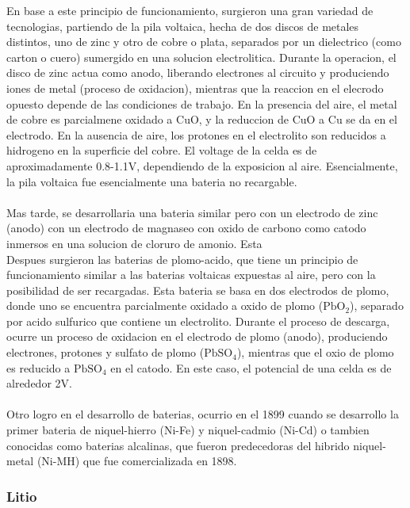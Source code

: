 \documentclass[10pt,a4paper]{article}
\begin{document}
    \clearpage

    \noindent En base a este principio de funcionamiento, surgieron una gran 
    variedad de tecnologias, partiendo de la pila voltaica, hecha de dos discos
    de metales distintos, uno de zinc y otro de cobre o plata, separados por un
    dielectrico (como carton o cuero) sumergido en una solucion electrolitica.
    Durante la operacion, el disco de zinc actua como anodo, liberando
    electrones al circuito y produciendo iones de metal (proceso de oxidacion),
    mientras que la reaccion en el elecrodo opuesto depende de las condiciones
    de trabajo. En la presencia del aire, el metal de cobre es parcialmene
    oxidado a CuO, y la reduccion de CuO a Cu se da en el electrodo. En la
    ausencia de aire, los protones en el electrolito son reducidos a hidrogeno
    en la superficie del cobre. El voltage de la celda es de aproximadamente
    0.8-1.1V, dependiendo de la exposicion al aire. Esencialmente, la pila
    voltaica fue esencialmente una bateria no recargable. \\
    \\
    \noindent Mas tarde, se desarrollaria una bateria similar pero con un 
    electrodo de zinc (anodo) con un electrodo de magnaseo con oxido de carbono 
    como catodo inmersos en una solucion de cloruro de amonio. Esta 
    \\
    \noindent Despues surgieron las baterias de plomo-acido, que tiene un 
    principio de funcionamiento similar a las baterias voltaicas expuestas al 
    aire, pero con la posibilidad de ser recargadas. Esta bateria se basa en 
    dos electrodos de plomo, donde uno se encuentra parcialmente oxidado a 
    oxido de plomo ($\mathrm{PbO_2}$), separado por acido sulfurico que contiene un 
    electrolito. Durante el proceso de descarga, ocurre un proceso de oxidacion 
    en el electrodo de plomo (anodo), produciendo electrones, protones y 
    sulfato de plomo ($\mathrm{PbSO_4}$), mientras que el oxio de plomo es reducido a 
    $\mathrm{PbSO_4}$ en el catodo. En este caso, el potencial de una celda es de 
    alrededor 2V.\\
    \\
    \noindent Otro logro en el desarrollo de baterias, ocurrio en el 1899 cuando 
    se desarrollo la primer bateria de niquel-hierro (Ni-Fe) y niquel-cadmio
    (Ni-Cd) o tambien conocidas como baterias alcalinas, que fueron
    predecedoras del hibrido niquel-metal (Ni-MH) que fue comercializada en
    1898.

    \subsubsection{Litio}
\end{document}
